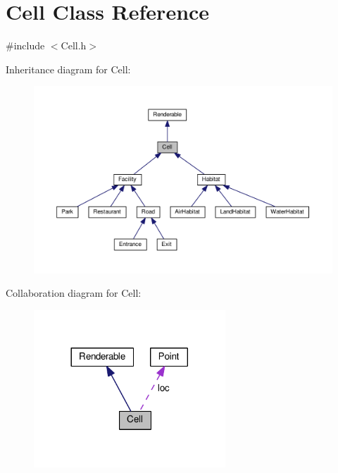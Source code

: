 \hypertarget{classCell}{}\section{Cell Class Reference}
\label{classCell}


{\ttfamily \#include $<$Cell.\+h$>$}



Inheritance diagram for Cell\+:
\nopagebreak
\begin{figure}[H]
\begin{center}
\leavevmode
\includegraphics[width=350pt]{classCell__inherit__graph}
\end{center}
\end{figure}


Collaboration diagram for Cell\+:
\nopagebreak
\begin{figure}[H]
\begin{center}
\leavevmode
\includegraphics[width=204pt]{classCell__coll__graph}
\end{center}
\end{figure}
